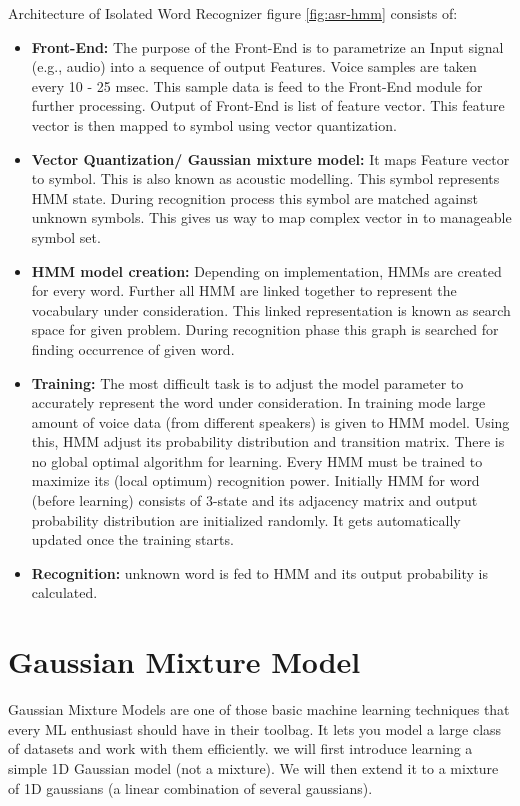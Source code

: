 \documentclass[12pt, a4paper, twoside]{report}
\begin{document}
Architecture of Isolated Word Recognizer figure \ref{fig:asr-hmm} consists of:
\begin{itemize}
\item \textbf{Front-End:} The purpose of the Front-End is to parametrize an Input signal (e.g., audio) into a sequence of output Features. Voice samples are taken every 10 - 25 msec. This sample data is feed to the Front-End module for further processing. Output of Front-End is list of feature vector. This feature vector is then mapped to symbol using vector quantization.
\item \textbf{Vector Quantization/ Gaussian mixture model:} It maps Feature vector to symbol. This is also known as acoustic modelling. This symbol represents HMM state. During recognition process this symbol are matched against unknown symbols. This gives us way to map complex vector in to manageable symbol set.
\item \textbf{HMM model creation:} Depending on implementation, HMMs are created for every word. Further all HMM are linked together to represent the vocabulary under consideration. This linked representation is known as search space for given problem. During recognition phase this graph is searched for finding occurrence of given word.
\item \textbf{Training:} The most difficult task is to adjust the model parameter to accurately represent the word under consideration. In training mode large amount of voice data (from different speakers) is given to HMM model. Using this, HMM adjust its probability distribution and transition matrix. There is no global optimal algorithm for learning. Every HMM must be trained to maximize its (local optimum) recognition power. Initially HMM for word (before learning) consists of 3-state and its adjacency matrix and output probability distribution are initialized randomly. It gets automatically updated once the training starts.
\item \textbf{Recognition:} unknown word is fed to HMM and its output probability is calculated.
\end{itemize}

\section{Gaussian Mixture Model}
Gaussian Mixture Models are one of those basic machine learning techniques that every ML enthusiast should have in their toolbag. It lets you model a large class of datasets and work with them efficiently. we will first introduce learning a simple 1D Gaussian model (not a mixture). We will then extend it to a mixture of 1D gaussians (a linear combination of several gaussians).
\end{document}
